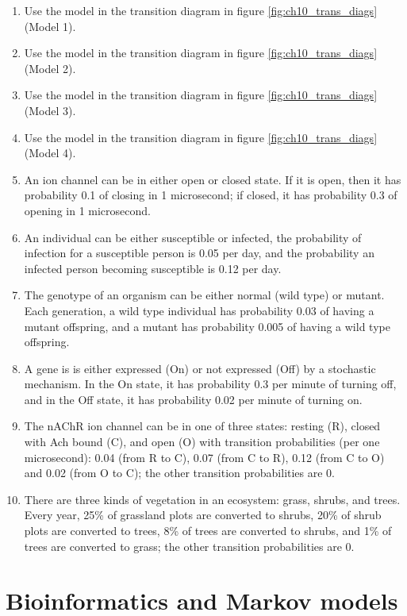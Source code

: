 \documentclass[
]{book}
\theoremstyle{definition}
\theoremstyle{definition}
\theoremstyle{definition}
\theoremstyle{remark}
\begin{document}
\begin{enumerate}
\def\labelenumi{\arabic{enumi}.}
\item
  Use the model in the transition diagram in figure \ref{fig:ch10_trans_diags} (Model 1).
\item
  Use the model in the transition diagram in figure \ref{fig:ch10_trans_diags} (Model 2).
\item
  Use the model in the transition diagram in figure \ref{fig:ch10_trans_diags} (Model 3).
\item
  Use the model in the transition diagram in figure \ref{fig:ch10_trans_diags} (Model 4).
\item
  An ion channel can be in either open or closed state. If it is open, then it has probability 0.1 of closing in 1 microsecond; if closed, it has probability 0.3 of opening in 1 microsecond.
\item
  An individual can be either susceptible or infected, the probability of infection for a susceptible person is 0.05 per day, and the probability an infected person becoming susceptible is 0.12 per day.
\item
  The genotype of an organism can be either normal (wild type) or mutant. Each generation, a wild type individual has probability 0.03 of having a mutant offspring, and a mutant has probability 0.005 of having a wild type offspring.
\item
  A gene is is either expressed (On) or not expressed (Off) by a stochastic mechanism. In the On state, it has probability 0.3 per minute of turning off, and in the Off state, it has probability 0.02 per minute of turning on.
\item
  The nAChR ion channel can be in one of three states: resting (R), closed with Ach bound (C), and open (O) with transition probabilities (per one microsecond): 0.04 (from R to C), 0.07 (from C to R), 0.12 (from C to O) and 0.02 (from O to C); the other transition probabilities are 0.
\item
  There are three kinds of vegetation in an ecosystem: grass, shrubs, and trees. Every year, 25\% of grassland plots are converted to shrubs, 20\% of shrub plots are converted to trees, 8\% of trees are converted to shrubs, and 1\% of trees are converted to grass; the other transition probabilities are 0.
\end{enumerate}

\hypertarget{bioinformatics-and-markov-models}{%
\section{Bioinformatics and Markov models}\label{bioinformatics-and-markov-models}}
\end{document}

